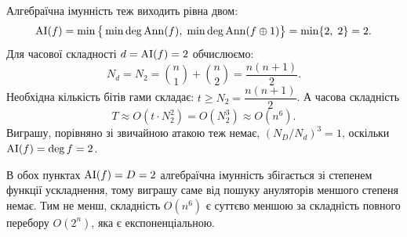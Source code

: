 \noindent Алгебраїчна імунність теж виходить рівна двом:
\begin{equation*}
    \operatorname{AI}(f) = \min\big\{\min \deg \operatorname{Ann}(f),\; \min \deg \operatorname{Ann}(f \oplus 1)\big\} = \min\{2,\; 2\} = 2.
\end{equation*}
Для часової складності $d = \operatorname{AI}(f) = 2$ обчислюємо:
\begin{equation*}
    N_d = N_2 = \binom{n}{1} + \binom{n}{2} = \frac{n(n+1)}{2}.
\end{equation*}
Необхідна кількість бітів гами складає: $t \geq N_2 = \dfrac{n(n+1)}{2}$. А часова складність
\begin{equation*}
    T \approx O \left(t \cdot N_2^2\right) = O \left(N_2^3\right) \approx O(n^6).
\end{equation*}
Виграшу, порівняно зі звичайною атакою теж немає, $(N_{D}/N_{d})^{3} = 1$, оскільки $\operatorname{AI}(f) = \deg f = 2$.

В обох пунктах $\operatorname{AI}(f) = D = 2$ алгебраїчна імунність збігається зі степенем функції ускладнення, тому виграшу 
саме від пошуку ануляторів меншого степеня немає. Тим не менш, складність $O(n^6)$ є суттєво меншою за складність 
повного перебору $O(2^n)$, яка є експоненціальною.
